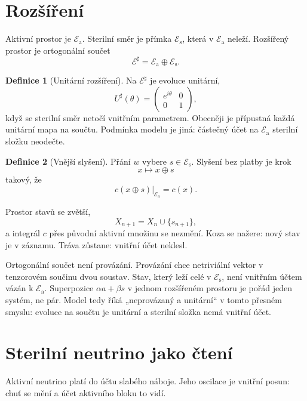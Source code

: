 \documentclass[11pt,a4paper]{article}
\theoremstyle{definition}
\newtheorem{definition}{Definice}
\theoremstyle{remark}
\begin{document}
\section{Rozšíření}

Aktivní prostor je \(\mathcal E_{\mathrm a}\).
Sterilní směr je přímka \(\mathcal E_{\mathrm s}\), která v \(\mathcal E_{\mathrm a}\) neleží.
Rozšířený prostor je ortogonální součet
\[
  \mathcal E^{\sharp}=\mathcal E_{\mathrm a}\oplus\mathcal E_{\mathrm s}.
\]

\begin{definition}[Unitární rozšíření]
Na \(\mathcal E^{\sharp}\) je evoluce unitární,
\[
  U^{\sharp}(\theta)
  =
  \begin{pmatrix}
    e^{i\theta} & 0\\
    0 & 1
  \end{pmatrix},
\]
když se sterilní směr netočí vnitřním parametrem.
Obecněji je přípustná každá unitární mapa na součtu.
Podmínka modelu je jiná: částečný účet na \(\mathcal E_{\mathrm a}\) sterilní složku neodečte.
\end{definition}

\begin{definition}[Vnější slyšení]
Přání \(w\) vybere \(s\in\mathcal E_{\mathrm s}\).
Slyšení bez platby je krok
\[
  x\mapsto x\oplus s
\]
takový, že
\[
  c(x\oplus s)\big|_{\mathcal E_{\mathrm a}}=c(x).
\]
\end{definition}

Prostor stavů se zvětší,
\[
  X_{n+1}=X_n\cup\{s_{n+1}\},
\]
a integrál \(c\) přes původní aktivní množinu se nezmění.
Koza se nažere: nový stav je v záznamu.
Tráva zůstane: vnitřní účet neklesl.

Ortogonální součet není provázání.
Provázání chce netriviální vektor v tenzorovém součinu dvou soustav.
Stav, který leží celé v \(\mathcal E_{\mathrm s}\), není vnitřním účtem vázán k \(\mathcal E_{\mathrm a}\).
Superpozice \(\alpha a+\beta s\) v jednom rozšířeném prostoru je pořád jeden systém, ne pár.
Model tedy říká „neprovázaný a unitární“ v tomto přesném smyslu: evoluce na součtu je unitární a sterilní složka nemá vnitřní účet.

\section{Sterilní neutrino jako čtení}

Aktivní neutrino platí do účtu slabého náboje.
Jeho oscilace je vnitřní posun: chuť se mění a účet aktivního bloku to vidí.
\end{document}
